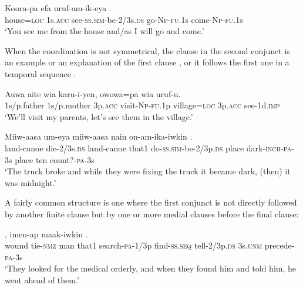 \ea%
\label{ex:8:x1851}
\gll Koora-pa  efa  uruf-am-ik-eya  \textstyleEmphasizedVernacularWords{-}\textstyleEmphasizedVernacularWords{-} \textstyleEmphasizedVernacularWords{-}\textstyleEmphasizedVernacularWords{-}.\\
house=\textsc{loc}  1s.\textsc{acc}  see-\textsc{ss}.\textsc{sim}-be-2/3s.\textsc{ds}  go-\textsc{Np}-\textsc{fu}.1s come-\textsc{Np}-\textsc{fu}.1s\\
\glt `You see me from the house and/as I will go and come.'
\z
{}

When the coordination is not symmetrical, the clause in the second conjunct is an example or an explanation of the first clause , or it follows the first one in a temporal sequence .

\ea%
\label{ex:8:x1370}
\gll Auwa  aite  wia  karu-i-yen,  owowa=pa wia  uruf-u.\\
1s/p.father  1s/p.mother  3p.\textsc{acc}  visit-\textsc{Np}-\textsc{fu}.1p  village=\textsc{loc} 3p.\textsc{acc}  see-1d.\textsc{imp}\\
\glt `We'll visit my parents, let's see them in the village.'
\z


\ea%
\label{ex:8:x1369}
\gll Miiw-aasa  um-eya  miiw-aasa  nain  on-am-ika-iwkin          .
\\
land-canoe  die-2/3s.\textsc{ds}  land-canoe  that1  do-\textsc{ss}.\textsc{sim}-be-2/3p.\textsc{ds}      place  dark-\textsc{inch}-\textsc{pa}-3s  place  ten  count?-\textsc{pa}-3s\\
\glt `The truck broke and while they were fixing the truck it became dark, (then) it was midnight.'
\z

A fairly common structure is one where the first conjunct is not directly followed by another finite clause but by one or more medial clauses before the final clause:


\ea%
\label{ex:8:x1371}
\gll {}        ,  imen-ap   maak-iwkin    .\\
 wound  tie-\textsc{nmz}  man  that1  search-\textsc{pa}-1/3p  find-\textsc{ss}.\textsc{seq} tell-2/3p.\textsc{ds}  3s.\textsc{unm}  precede-\textsc{pa}-3s\\ 
\glt`They looked for the medical orderly, and when they found him and told him, he went ahead of them.'
\z



